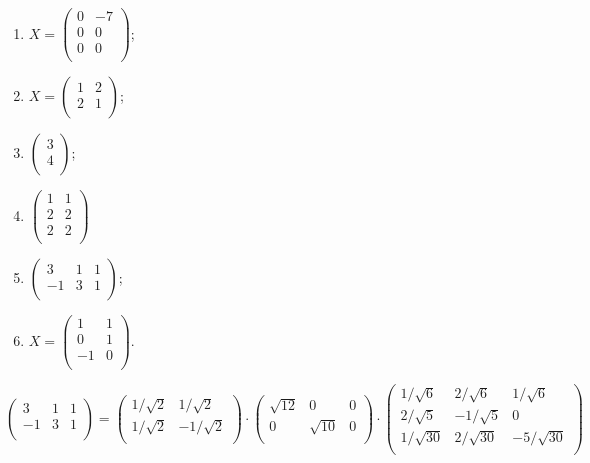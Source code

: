   
  \begin{problem}
  \begin{enumerate}
    \item
  $X = \begin{pmatrix}
  0 & -7 \\
  0 & 0 \\
  0 & 0 \\
  \end{pmatrix}$;
  \item
  $X = \begin{pmatrix}
  1 & 2 \\
  2 & 1 \\
  \end{pmatrix}$;
  \item
  $\begin{pmatrix}
  3 \\
  4 \\
  \end{pmatrix}$;
  \item
  $\begin{pmatrix}
  1 & 1 \\
  2 & 2 \\
  2 & 2 \\
  \end{pmatrix}$
  \item
  $\begin{pmatrix}
  3 & 1 & 1\\
  -1 & 3 & 1 \\
  \end{pmatrix}$;
  \item $X = \begin{pmatrix}
    1 & 1 \\
    0 & 1 \\
    -1 & 0 \\
    \end{pmatrix}$.  
\end{enumerate}
  
  \begin{sol}
  $\begin{pmatrix}
  3 & 1 & 1\\
  -1 & 3 & 1 \\
  \end{pmatrix}=
  \begin{pmatrix}
  1/\sqrt{2} & 1/\sqrt{2} \\
  1/\sqrt{2} & -1/\sqrt{2} \\
  \end{pmatrix}
  \cdot \begin{pmatrix}
  \sqrt{12} & 0 & 0 \\
  0 & \sqrt{10} & 0 \\
  \end{pmatrix}\cdot
  \begin{pmatrix}
  1/\sqrt{6} & 2/\sqrt{6} & 1/\sqrt{6} \\
  2/\sqrt{5} & -1/\sqrt{5} & 0 \\
  1/\sqrt{30} & 2/\sqrt{30} & -5/\sqrt{30} \\
  \end{pmatrix}$


\end{sol}
\end{problem}
